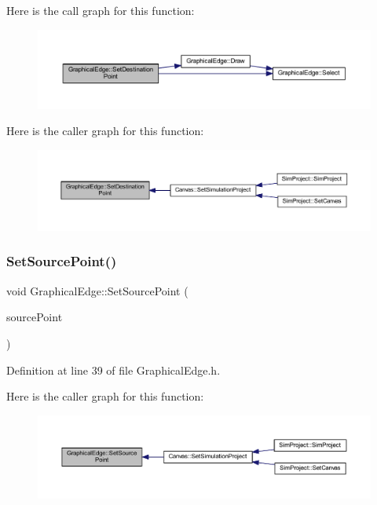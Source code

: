 Here is the call graph for this function\+:
\nopagebreak
\begin{figure}[H]
\begin{center}
\leavevmode
\includegraphics[width=350pt]{class_graphical_edge_af6eedeeadcd9abc368b1c0725617f5c9_cgraph}
\end{center}
\end{figure}
Here is the caller graph for this function\+:
\nopagebreak
\begin{figure}[H]
\begin{center}
\leavevmode
\includegraphics[width=350pt]{class_graphical_edge_af6eedeeadcd9abc368b1c0725617f5c9_icgraph}
\end{center}
\end{figure}
\mbox{\label{class_graphical_edge_a02acb6e42ac2d6def8a662006db2b1ff}} 
\subsubsection{\texorpdfstring{Set\+Source\+Point()}{SetSourcePoint()}}
{\footnotesize\ttfamily void Graphical\+Edge\+::\+Set\+Source\+Point (\begin{DoxyParamCaption}\item[{wx\+Point2\+D\+Double}]{source\+Point }\end{DoxyParamCaption})\hspace{0.3cm}{\ttfamily [inline]}}



Definition at line 39 of file Graphical\+Edge.\+h.

Here is the caller graph for this function\+:
\nopagebreak
\begin{figure}[H]
\begin{center}
\leavevmode
\includegraphics[width=350pt]{class_graphical_edge_a02acb6e42ac2d6def8a662006db2b1ff_icgraph}
\end{center}
\end{figure}


